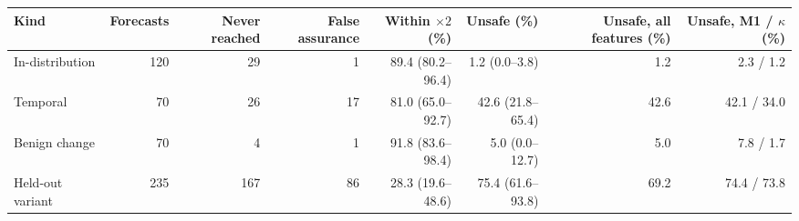 \begin{tabular}{lrrrrrrr}
\toprule
Kind & Forecasts & Never reached & False assurance & Within $\times2$ (\%) & Unsafe (\%) & Unsafe, all features (\%) & Unsafe, M1 / $\kappa$ (\%) \\
\midrule
In-distribution & 120 & 29 & 1 & 89.4 (80.2--96.4) & 1.2 (0.0--3.8) & 1.2 & 2.3 / 1.2 \\
Temporal & 70 & 26 & 17 & 81.0 (65.0--92.7) & 42.6 (21.8--65.4) & 42.6 & 42.1 / 34.0 \\
Benign change & 70 & 4 & 1 & 91.8 (83.6--98.4) & 5.0 (0.0--12.7) & 5.0 & 7.8 / 1.7 \\
Held-out variant & 235 & 167 & 86 & 28.3 (19.6--48.6) & 75.4 (61.6--93.8) & 69.2 & 74.4 / 73.8 \\
\bottomrule
\end{tabular}
